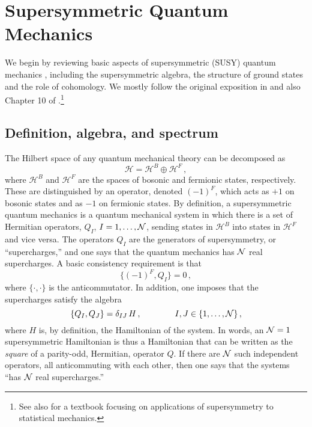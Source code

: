 \documentclass[11pt]{article}
\numberwithin{equation}{section}
\def\cN{{\cal N}}
\newcommand\equ[1] {\begin{equation}#1\end{equation}}
\renewcommand\( {\left(}
\renewcommand\) {\right)}
\def\cH{\mathcal H}
\begin{document}

\section{Supersymmetric Quantum Mechanics}
\label{sec:Supersymmetric Quantum Mechanics}

We begin by reviewing basic aspects of supersymmetric (SUSY) quantum mechanics  \cite{Nicolai:1976xp, Witten:1981nf,Witten:1982df,Witten:1982im}, including the supersymmetric algebra,  the structure of ground states and  the role of cohomology. We mostly follow the original exposition in \cite{Witten:1982df,Witten:1982im} and also Chapter 10 of  \cite{Hori:2003ic}.\footnote{See also \cite{JunkerSUSYBook} for a textbook focusing on applications of supersymmetry to statistical mechanics.}
 


\subsection{Definition, algebra, and spectrum}

The Hilbert space of  any quantum mechanical theory can be decomposed as 
\equ{\label{HFB}
\cH= \cH^{B}\oplus \cH^{F}\,,
}
where $\cH^{B}$ and $\cH^{F}$ are the spaces of bosonic and fermionic states, respectively. These are distinguished by an operator, denoted $(-1)^{F}$, which  acts  as $+1$ on bosonic states and as $-1$ on fermionic states.  By definition, a supersymmetric quantum mechanics is a quantum mechanical system in which there is a set of Hermitian operators, $Q_I$, $I=1,\ldots,\cN$, sending states in $\cH^{B}$ into states in $\cH^{F}$ and vice versa. The operators $Q_{I}$ are the generators of supersymmetry, or ``supercharges,'' and one says that the quantum mechanics has $\cN$ real supercharges.  A basic consistency requirement is that 
\equ{\label{QF}
\{(-1)^{F},Q_I\}=0\,,
}
where $\{\cdot,\cdot\}$ is the anticommutator. In addition, one imposes that the supercharges satisfy the algebra
\equ{\label{qiqjH}
\{Q_I,Q_J\} =\delta_{IJ}\, H\,,\qquad \qquad I,J\in\{1,\ldots,\cN\}\,,
}
where $H$ is, by definition,  the Hamiltonian of the system. In words, an $\cN=1$ supersymmetric Hamiltonian is thus a Hamiltonian that can be written as the {\it square} of a parity-odd, Hermitian, operator $Q$. If there are $\cN$ such independent operators, all anticommuting with each other,  then one says that the systems ``has $\cN$ real supercharges.'' 
\end{document}
